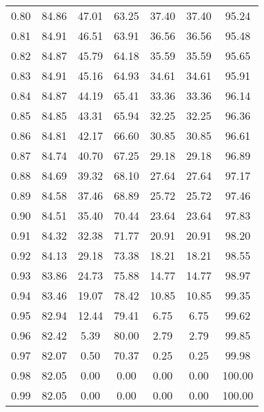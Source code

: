\begin{tabular}{|c|c|c|c|c|c|c|}
      0.80 &     84.86 &     47.01 &      63.25 &   37.40 &      37.40 &         95.24 \\
      0.81 &     84.91 &     46.51 &      63.91 &   36.56 &      36.56 &         95.48 \\
      0.82 &     84.87 &     45.79 &      64.18 &   35.59 &      35.59 &         95.65 \\
      0.83 &     84.91 &     45.16 &      64.93 &   34.61 &      34.61 &         95.91 \\
      0.84 &     84.87 &     44.19 &      65.41 &   33.36 &      33.36 &         96.14 \\
      0.85 &     84.85 &     43.31 &      65.94 &   32.25 &      32.25 &         96.36 \\
      0.86 &     84.81 &     42.17 &      66.60 &   30.85 &      30.85 &         96.61 \\
      0.87 &     84.74 &     40.70 &      67.25 &   29.18 &      29.18 &         96.89 \\
      0.88 &     84.69 &     39.32 &      68.10 &   27.64 &      27.64 &         97.17 \\
      0.89 &     84.58 &     37.46 &      68.89 &   25.72 &      25.72 &         97.46 \\
      0.90 &     84.51 &     35.40 &      70.44 &   23.64 &      23.64 &         97.83 \\
      0.91 &     84.32 &     32.38 &      71.77 &   20.91 &      20.91 &         98.20 \\
      0.92 &     84.13 &     29.18 &      73.38 &   18.21 &      18.21 &         98.55 \\
      0.93 &     83.86 &     24.73 &      75.88 &   14.77 &      14.77 &         98.97 \\
      0.94 &     83.46 &     19.07 &      78.42 &   10.85 &      10.85 &         99.35 \\
      0.95 &     82.94 &     12.44 &      79.41 &    6.75 &       6.75 &         99.62 \\
      0.96 &     82.42 &      5.39 &      80.00 &    2.79 &       2.79 &         99.85 \\
      0.97 &     82.07 &      0.50 &      70.37 &    0.25 &       0.25 &         99.98 \\
      0.98 &     82.05 &      0.00 &       0.00 &    0.00 &       0.00 &        100.00 \\
      0.99 &     82.05 &      0.00 &       0.00 &    0.00 &       0.00 &        100.00 \\
\bottomrule
\end{tabular}
